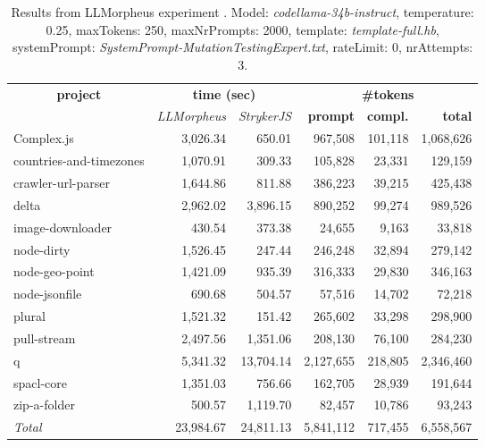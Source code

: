 
\begin{table*}[hbt!]
\centering
{\scriptsize
\begin{tabular}{l||r|r|r|r|r}
\multicolumn{1}{c|}{\bf project} & \multicolumn{2}{|c|}{\bf time (sec)} & \multicolumn{3}{|c|}{\bf \#tokens} \\
               & {\it LLMorpheus} & {\it StrykerJS} & {\bf prompt} & {\bf compl.} & {\bf total} \\
\hline
  Complex.js & 3,026.34 & 650.01 & 967,508 & 101,118 & 1,068,626 \\ 
countries-and-timezones & 1,070.91 & 309.33 & 105,828 & 23,331 & 129,159 \\ 
crawler-url-parser & 1,644.86 & 811.88 & 386,223 & 39,215 & 425,438 \\ 
delta & 2,962.02 & 3,896.15 & 890,252 & 99,274 & 989,526 \\ 
image-downloader & 430.54 & 373.38 & 24,655 & 9,163 & 33,818 \\ 
node-dirty & 1,526.45 & 247.44 & 246,248 & 32,894 & 279,142 \\ 
node-geo-point & 1,421.09 & 935.39 & 316,333 & 29,830 & 346,163 \\ 
node-jsonfile & 690.68 & 504.57 & 57,516 & 14,702 & 72,218 \\ 
plural & 1,521.32 & 151.42 & 265,602 & 33,298 & 298,900 \\ 
pull-stream & 2,497.56 & 1,351.06 & 208,130 & 76,100 & 284,230 \\ 
q & 5,341.32 & 13,704.14 & 2,127,655 & 218,805 & 2,346,460 \\ 
spacl-core & 1,351.03 & 756.66 & 162,705 & 28,939 & 191,644 \\ 
zip-a-folder & 500.57 & 1,119.70 & 82,457 & 10,786 & 93,243 \\ 
\hline
  \textit{Total} & 23,984.67 & 24,811.13 & 5,841,112 & 717,455 & 6,558,567 \\
  \end{tabular}
  }
  \\[2mm]
  \caption{Results from LLMorpheus experiment .
    Model: \textit{codellama-34b-instruct}, 
    temperature: 0.25, 
    maxTokens: 250, 
    maxNrPrompts: 2000, 
    template: \textit{template-full.hb}, 
    systemPrompt: \textit{SystemPrompt-MutationTestingExpert.txt}, 
    rateLimit: 0, 
    nrAttempts: 3.  
  }
  \label{table:Cost:run351:codellama-34b-instruct:template-full.hb:0.25}
\end{table*}
